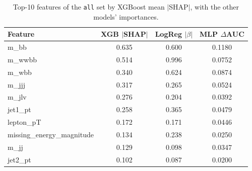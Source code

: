 \begin{table}[!t]
\centering
\caption{Top-10 features of the \texttt{all} set by XGBoost mean $|$SHAP$|$, with the other models' importances.}
\label{tab:importance}
\footnotesize
\setlength{\tabcolsep}{3.5pt}
\begin{tabular}{lccc}
\toprule
Feature & XGB $|$SHAP$|$ & LogReg $|\beta|$ & MLP $\Delta$AUC \\
\midrule
m\_bb & 0.635 & 0.600 & 0.1180 \\
m\_wwbb & 0.514 & 0.996 & 0.0752 \\
m\_wbb & 0.340 & 0.624 & 0.0874 \\
m\_jjj & 0.317 & 0.265 & 0.0524 \\
m\_jlv & 0.276 & 0.204 & 0.0392 \\
jet1\_pt & 0.258 & 0.365 & 0.0479 \\
lepton\_pT & 0.172 & 0.171 & 0.0446 \\
missing\_energy\_magnitude & 0.134 & 0.238 & 0.0250 \\
m\_jj & 0.129 & 0.098 & 0.0347 \\
jet2\_pt & 0.102 & 0.087 & 0.0200 \\
\bottomrule
\end{tabular}
\end{table}
